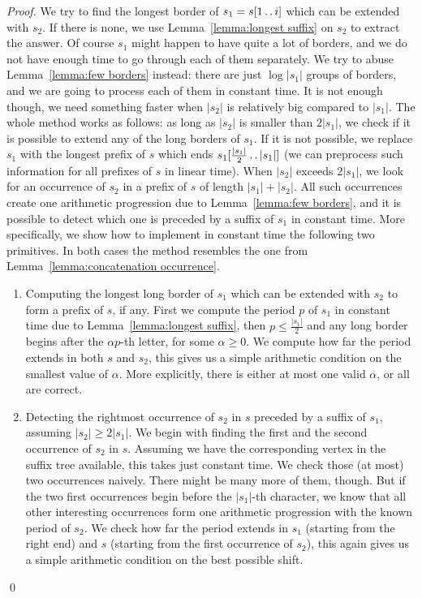 \documentclass[runningheads]{llncs}
\newcommand{\twodots}{\mathinner{\ldotp\ldotp}}
\begin{document}
\begin{proof}
We try to find the longest border of $s_1=s[1\twodots i]$ which can be extended with $s_2$. If there is none, we use Lemma~\ref{lemma:longest suffix} on $s_2$ to extract the answer. Of course $s_1$ might happen to have quite a lot of borders, and we do not have enough time to go through each of them separately. We try to abuse Lemma~\ref{lemma:few borders} instead: there are just $\log |s_1|$ groups of borders, and we are going to process each of them in constant time. It is not enough though, we need something faster when $|s_2|$ is relatively big compared to $|s_1|$. The whole method works as follows: as long as $|s_2|$ is smaller than $2|s_1|$, we check if it is possible to extend any of the long borders of $s_1$. If it is not possible, we replace $s_1$ with the longest prefix of $s$ which ends $s_1[\frac{|s_1|}{2}\twodots |s_1|]$ (we can preprocess such information for all prefixes of $s$ in linear time). When $|s_2|$ exceeds $2|s_1|$, we look for an occurrence of $s_2$ in a prefix of $s$ of length $|s_1|+|s_2|$. All such occurrences create one arithmetic progression due to Lemma~\ref{lemma:few borders}, and it is possible to detect which one is preceded by a suffix of $s_1$ in constant time. More specifically, we show how to implement in constant time the following two primitives. In both cases the method resembles the one from Lemma~\ref{lemma:concatenation occurrence}.

\begin{enumerate}
\item Computing the longest long border of $s_1$ which can be extended with $s_2$ to form a prefix of $s$, if any. First we compute the period $p$ of $s_1$ in constant time due to Lemma~\ref{lemma:longest suffix}, then $p\leq \frac{|s_1|}{2}$ and any long border begins after the $\alpha p$-th letter, for some $\alpha \geq 0$. We compute how far the period extends in both $s$ and $s_2$, this gives us a simple arithmetic condition on the smallest value of $\alpha$. More explicitly, there is either at most one valid $\alpha$, or all are correct.

\item Detecting the rightmost occurrence of $s_2$ in $s$ preceded by a suffix of $s_1$, assuming $|s_2|\geq 2|s_1|$. We begin with finding the first and the second occurrence of $s_2$ in $s$. Assuming we have the corresponding vertex in the suffix tree available, this takes just constant time. We check those (at most) two occurrences naively. There might be many more of them, though. But if the two first occurrences begin before the $|s_1|$-th character, we know that all other interesting occurrences form one arithmetic progression with the known period of $s_2$. We check how far the period extends in $s_1$ (starting from the right end) and $s$ (starting from the first occurrence of $s_2$), this again gives us a simple arithmetic condition on the best possible shift.
\end{enumerate}
\qed
\end{proof}
\end{document}
